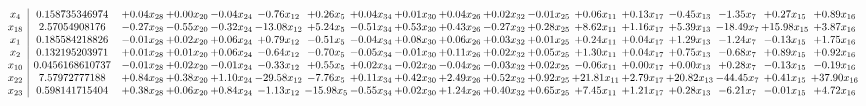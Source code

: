 \documentclass[9pt]{article}
\begin{document}
 \[\begin{array}{c| c c@{\hskip 2pt} c@{\hskip 2pt} c@{\hskip 2pt} c@{\hskip 2pt} c@{\hskip 2pt} c@{\hskip 2pt} c@{\hskip 2pt} c@{\hskip 2pt} c@{\hskip 2pt} c@{\hskip 2pt} c@{\hskip 2pt} c@{\hskip 2pt} c@{\hskip 2pt} c@{\hskip 2pt} c@{\hskip 2pt} c@{\hskip 2pt} }
 x_{4}   &  0.158735346974 & +  0.04 x_{28} & +  0.00 x_{20} & -0.04 x_{24} & -0.76 x_{12} & +  0.26 x_{5} & +  0.04 x_{34} & +  0.01 x_{30} & +  0.04 x_{26} & +  0.02 x_{32} & -0.01 x_{25} & +  0.06 x_{11} & +  0.13 x_{17} & -0.45 x_{13} & -1.35 x_{7} & +  0.27 x_{15} & +  0.89 x_{16}\\
 x_{18}   &  2.57054908176 & -0.27 x_{28} & -0.55 x_{20} & -0.32 x_{24} & -13.08 x_{12} & +  5.24 x_{5} & -0.51 x_{34} & +  0.53 x_{30} & +  0.43 x_{26} & -0.27 x_{32} & +  0.28 x_{25} & +  8.62 x_{11} & +  1.16 x_{17} & +  5.39 x_{13} & -18.49 x_{7} & + 15.98 x_{15} & +  3.87 x_{16}\\
 x_{1}   &  0.185584218826 & -0.01 x_{28} & +  0.02 x_{20} & +  0.06 x_{24} & +  0.79 x_{12} & -0.51 x_{5} & -0.04 x_{34} & +  0.08 x_{30} & +  0.06 x_{26} & +  0.03 x_{32} & +  0.01 x_{25} & +  0.24 x_{11} & +  0.04 x_{17} & +  1.29 x_{13} & -1.24 x_{7} & -0.13 x_{15} & +  1.75 x_{16}\\
 x_{2}   &  0.132195203971 & +  0.01 x_{28} & +  0.01 x_{20} & +  0.06 x_{24} & -0.64 x_{12} & -0.70 x_{5} & -0.05 x_{34} & -0.01 x_{30} & +  0.11 x_{26} & +  0.02 x_{32} & +  0.05 x_{25} & +  1.30 x_{11} & +  0.04 x_{17} & +  0.75 x_{13} & -0.68 x_{7} & +  0.89 x_{15} & +  0.92 x_{16}\\
 x_{10}   &  0.0456168610737 & -0.01 x_{28} & +  0.02 x_{20} & -0.01 x_{24} & -0.33 x_{12} & +  0.55 x_{5} & +  0.02 x_{34} & -0.02 x_{30} & -0.04 x_{26} & -0.03 x_{32} & +  0.02 x_{25} & -0.06 x_{11} & +  0.00 x_{17} & +  0.00 x_{13} & +  0.28 x_{7} & -0.13 x_{15} & -0.19 x_{16}\\
 x_{22}   &  7.57972777188 & +  0.84 x_{28} & +  0.38 x_{20} & +  1.10 x_{24} & -29.58 x_{12} & -7.76 x_{5} & +  0.11 x_{34} & +  0.42 x_{30} & +  2.49 x_{26} & +  0.52 x_{32} & +  0.92 x_{25} & + 21.81 x_{11} & +  2.79 x_{17} & + 20.82 x_{13} & -44.45 x_{7} & +  0.41 x_{15} & + 37.90 x_{16}\\
 x_{23}   &  0.598141715404 & +  0.38 x_{28} & +  0.06 x_{20} & +  0.84 x_{24} & -1.13 x_{12} & -15.98 x_{5} & -0.55 x_{34} & +  0.02 x_{30} & +  1.24 x_{26} & +  0.40 x_{32} & +  0.65 x_{25} & +  7.45 x_{11} & +  1.21 x_{17} & +  0.28 x_{13} & -6.21 x_{7} & -0.01 x_{15} & +  4.72 x_{16}\\

\end{array}\]
\end{document}
